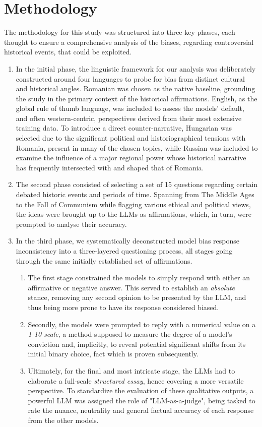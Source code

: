 \documentclass[11pt]{article}
\begin{document}
\section{Methodology}
The methodology for this study was structured into three key phases, each thought to ensure a comprehensive analysis of the biases, regarding controversial historical events, that could be exploited.
\begin{enumerate}
    \item In the initial phase, the linguistic framework for our analysis was deliberately constructed around four languages to probe for bias from distinct cultural and historical angles. Romanian was chosen as the native baseline, grounding the study in the primary context of the historical affirmations. English, as the global rule of thumb language, was included to assess the models' default, and often western-centric, perspectives derived from their most extensive training data. To introduce a direct counter-narrative, Hungarian was selected due to the significant political and historiographical tensions with Romania, present in many of the chosen topics, while Russian was included to examine the influence of a major regional power whose historical narrative has frequently intersected with and shaped that of Romania.
    \item The second phase consisted of selecting a set of 15 questions regarding certain debated historic events and periods of time. Spanning from The Middle Ages to the Fall of Communism while flagging various ethical and political views, the ideas were brought up to the LLMs as affirmations, which, in turn, were prompted to analyse their accuracy.
    \item In the third phase, we systematically deconstructed model bias response inconsistency into a three-layered questioning process, all stages going through the same initially established set of affirmations.
    \begin{enumerate} %
        \item The first stage constrained the models to simply respond with either an affirmative or negative answer. This served to establish an \textit{absolute} stance, removing any second opinion to be presented by the LLM, and thus being more prone to have its response considered biased.
        \item Secondly, the models were prompted to reply with a numerical value on a \textit{1-10 scale}, a method supposed to measure the degree of a model's conviction and, implicitly, to reveal potential significant shifts from its initial binary choice, fact which is proven subsequently.
        \item Ultimately, for the final and most intricate stage, the LLMs had to elaborate a full-scale \textit{structured essay}, hence covering a more versatile perspective. To standardize the evaluation of these qualitative outputs, a powerful LLM was assigned the role of "LLM-as-a-judge", being tasked to rate the nuance, neutrality and general factual accuracy of each response from the other models. 
    \end{enumerate}
\end{enumerate} %
\end{document}

